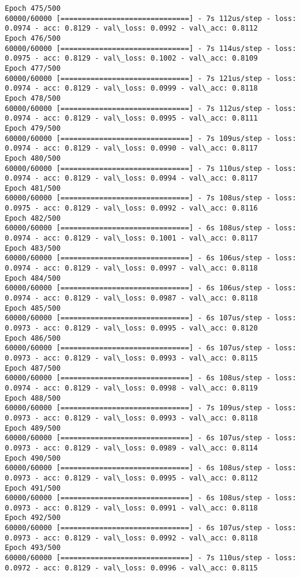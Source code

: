 \documentclass[11pt]{article}
\begin{document}
\begin{Verbatim}[commandchars=\\\{\}]
Epoch 475/500
60000/60000 [==============================] - 7s 112us/step - loss: 0.0974 - acc: 0.8129 - val\_loss: 0.0992 - val\_acc: 0.8112
Epoch 476/500
60000/60000 [==============================] - 7s 114us/step - loss: 0.0975 - acc: 0.8129 - val\_loss: 0.1002 - val\_acc: 0.8109
Epoch 477/500
60000/60000 [==============================] - 7s 121us/step - loss: 0.0974 - acc: 0.8129 - val\_loss: 0.0999 - val\_acc: 0.8118
Epoch 478/500
60000/60000 [==============================] - 7s 112us/step - loss: 0.0974 - acc: 0.8129 - val\_loss: 0.0995 - val\_acc: 0.8111
Epoch 479/500
60000/60000 [==============================] - 7s 109us/step - loss: 0.0974 - acc: 0.8129 - val\_loss: 0.0990 - val\_acc: 0.8117
Epoch 480/500
60000/60000 [==============================] - 7s 110us/step - loss: 0.0974 - acc: 0.8129 - val\_loss: 0.0994 - val\_acc: 0.8117
Epoch 481/500
60000/60000 [==============================] - 7s 108us/step - loss: 0.0975 - acc: 0.8129 - val\_loss: 0.0992 - val\_acc: 0.8116
Epoch 482/500
60000/60000 [==============================] - 6s 108us/step - loss: 0.0974 - acc: 0.8129 - val\_loss: 0.1001 - val\_acc: 0.8117
Epoch 483/500
60000/60000 [==============================] - 6s 106us/step - loss: 0.0974 - acc: 0.8129 - val\_loss: 0.0997 - val\_acc: 0.8118
Epoch 484/500
60000/60000 [==============================] - 6s 106us/step - loss: 0.0974 - acc: 0.8129 - val\_loss: 0.0987 - val\_acc: 0.8118
Epoch 485/500
60000/60000 [==============================] - 6s 107us/step - loss: 0.0973 - acc: 0.8129 - val\_loss: 0.0995 - val\_acc: 0.8120
Epoch 486/500
60000/60000 [==============================] - 6s 107us/step - loss: 0.0973 - acc: 0.8129 - val\_loss: 0.0993 - val\_acc: 0.8115
Epoch 487/500
60000/60000 [==============================] - 6s 108us/step - loss: 0.0974 - acc: 0.8129 - val\_loss: 0.0998 - val\_acc: 0.8119
Epoch 488/500
60000/60000 [==============================] - 7s 109us/step - loss: 0.0973 - acc: 0.8129 - val\_loss: 0.0993 - val\_acc: 0.8118
Epoch 489/500
60000/60000 [==============================] - 6s 107us/step - loss: 0.0973 - acc: 0.8129 - val\_loss: 0.0989 - val\_acc: 0.8114
Epoch 490/500
60000/60000 [==============================] - 6s 108us/step - loss: 0.0973 - acc: 0.8129 - val\_loss: 0.0995 - val\_acc: 0.8112
Epoch 491/500
60000/60000 [==============================] - 6s 108us/step - loss: 0.0973 - acc: 0.8129 - val\_loss: 0.0991 - val\_acc: 0.8118
Epoch 492/500
60000/60000 [==============================] - 6s 107us/step - loss: 0.0973 - acc: 0.8129 - val\_loss: 0.0992 - val\_acc: 0.8118
Epoch 493/500
60000/60000 [==============================] - 7s 110us/step - loss: 0.0972 - acc: 0.8129 - val\_loss: 0.0996 - val\_acc: 0.8115

\end{Verbatim}
\end{document}
